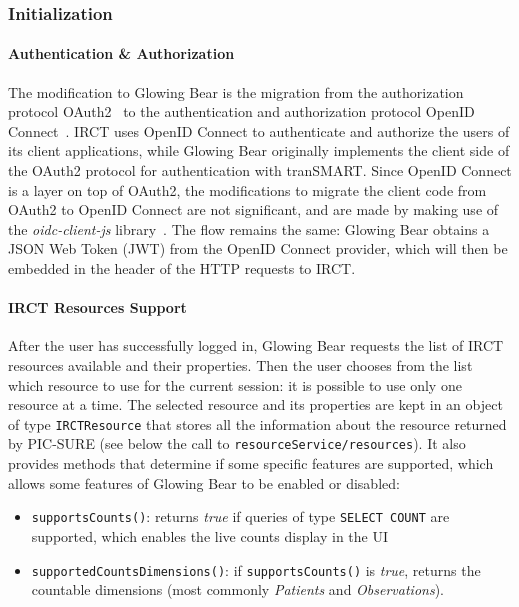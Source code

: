 \subsubsection{Initialization}

\paragraph{Authentication \& Authorization}
The modification to Glowing Bear is the migration from the authorization protocol OAuth2~\cite{oauth2} to the authentication and authorization protocol OpenID Connect~\cite{openidconnect}.
IRCT uses OpenID Connect to authenticate and authorize the users of its client applications, while Glowing Bear originally implements the client side of the OAuth2 protocol for authentication with tranSMART. 
Since OpenID Connect is a layer on top of OAuth2, the modifications to migrate the client code from OAuth2 to OpenID Connect are not significant, and are made by making use of the \emph{oidc-client-js} library~\cite{oidc-client-js}.
The flow remains the same: Glowing Bear obtains a JSON Web Token (JWT) from the OpenID Connect provider, which will then be embedded in the header of the HTTP requests to IRCT.

\paragraph{IRCT Resources Support}

After the user has successfully logged in, Glowing Bear requests the list of IRCT resources available and their properties.
Then the user chooses from the list which resource to use for the current session: it is possible to use only one resource at a time.
The selected resource and its properties are kept in an object of type \verb|IRCTResource| that stores all the information about the resource returned by PIC-SURE (see below the call to \verb|resourceService/resources|).
It also provides methods that determine if some specific features are supported, which allows some features of Glowing Bear to be enabled or disabled:
\begin{itemize}
    \item \verb|supportsCounts()|: returns \emph{true} if queries of type \verb|SELECT COUNT| are supported, which enables the live counts display in the UI
    \item \verb|supportedCountsDimensions()|: if \verb|supportsCounts()| is \emph{true}, returns the countable dimensions (most commonly \emph{Patients} and \emph{Observations}).
\end{itemize}

